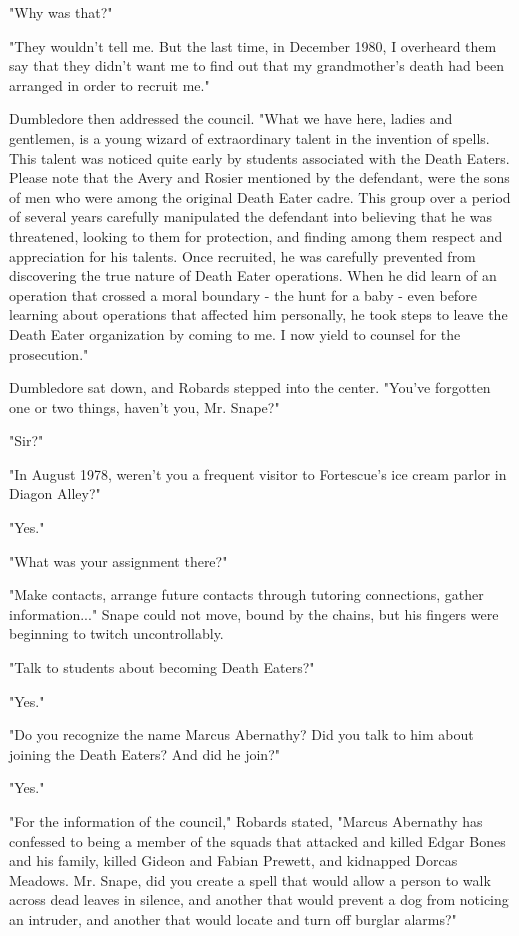 \documentclass[a4paper,11pt]{article}
\begin{document}
"Why was that?"

"They wouldn't tell me. But the last time, in December 1980, I overheard them say that they didn't want me to find out that my grandmother's death had been arranged in order to recruit me."

Dumbledore then addressed the council. "What we have here, ladies and gentlemen, is a young wizard of extraordinary talent in the invention of spells. This talent was noticed quite early by students associated with the Death Eaters. Please note that the Avery and Rosier mentioned by the defendant, were the sons of men who were among the original Death Eater cadre. This group over a period of several years carefully manipulated the defendant into believing that he was threatened, looking to them for protection, and finding among them respect and appreciation for his talents. Once recruited, he was carefully prevented from discovering the true nature of Death Eater operations. When he did learn of an operation that crossed a moral boundary - the hunt for a baby - even before learning about operations that affected him personally, he took steps to leave the Death Eater organization by coming to me. I now yield to counsel for the prosecution."

Dumbledore sat down, and Robards stepped into the center. "You've forgotten one or two things, haven't you, Mr. Snape?"

"Sir?"

"In August 1978, weren't you a frequent visitor to Fortescue's ice cream parlor in Diagon Alley?"

"Yes."

"What was your assignment there?"

"Make contacts, arrange future contacts through tutoring connections, gather information..." Snape could not move, bound by the chains, but his fingers were beginning to twitch uncontrollably.

"Talk to students about becoming Death Eaters?"

"Yes."

"Do you recognize the name Marcus Abernathy? Did you talk to him about joining the Death Eaters? And did he join?"

"Yes."

"For the information of the council," Robards stated, "Marcus Abernathy has confessed to being a member of the squads that attacked and killed Edgar Bones and his family, killed Gideon and Fabian Prewett, and kidnapped Dorcas Meadows. Mr. Snape, did you create a spell that would allow a person to walk across dead leaves in silence, and another that would prevent a dog from noticing an intruder, and another that would locate and turn off burglar alarms?"
\end{document}
